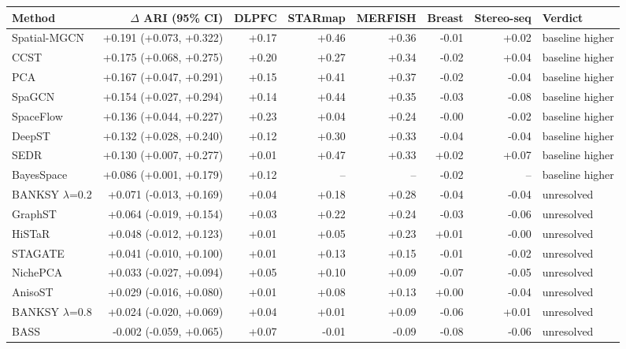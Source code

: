 \begin{tabular}{lrrrrrrl}
\toprule
Method & $\Delta$ ARI (95\% CI) & DLPFC & STARmap & MERFISH & Breast & Stereo-seq & Verdict \\
\midrule
Spatial-MGCN & +0.191 (+0.073, +0.322) & +0.17 & +0.46 & +0.36 & -0.01 & +0.02 & baseline higher \\
CCST & +0.175 (+0.068, +0.275) & +0.20 & +0.27 & +0.34 & -0.02 & +0.04 & baseline higher \\
PCA & +0.167 (+0.047, +0.291) & +0.15 & +0.41 & +0.37 & -0.02 & -0.04 & baseline higher \\
SpaGCN & +0.154 (+0.027, +0.294) & +0.14 & +0.44 & +0.35 & -0.03 & -0.08 & baseline higher \\
SpaceFlow & +0.136 (+0.044, +0.227) & +0.23 & +0.04 & +0.24 & -0.00 & -0.02 & baseline higher \\
DeepST & +0.132 (+0.028, +0.240) & +0.12 & +0.30 & +0.33 & -0.04 & -0.04 & baseline higher \\
SEDR & +0.130 (+0.007, +0.277) & +0.01 & +0.47 & +0.33 & +0.02 & +0.07 & baseline higher \\
BayesSpace & +0.086 (+0.001, +0.179) & +0.12 & -- & -- & -0.02 & -- & baseline higher \\
BANKSY $\lambda$=0.2 & +0.071 (-0.013, +0.169) & +0.04 & +0.18 & +0.28 & -0.04 & -0.04 & unresolved \\
GraphST & +0.064 (-0.019, +0.154) & +0.03 & +0.22 & +0.24 & -0.03 & -0.06 & unresolved \\
HiSTaR & +0.048 (-0.012, +0.123) & +0.01 & +0.05 & +0.23 & +0.01 & -0.00 & unresolved \\
STAGATE & +0.041 (-0.010, +0.100) & +0.01 & +0.13 & +0.15 & -0.01 & -0.02 & unresolved \\
NichePCA & +0.033 (-0.027, +0.094) & +0.05 & +0.10 & +0.09 & -0.07 & -0.05 & unresolved \\
AnisoST & +0.029 (-0.016, +0.080) & +0.01 & +0.08 & +0.13 & +0.00 & -0.04 & unresolved \\
BANKSY $\lambda$=0.8 & +0.024 (-0.020, +0.069) & +0.04 & +0.01 & +0.09 & -0.06 & +0.01 & unresolved \\
BASS & -0.002 (-0.059, +0.065) & +0.07 & -0.01 & -0.09 & -0.08 & -0.06 & unresolved \\
\bottomrule
\end{tabular}
